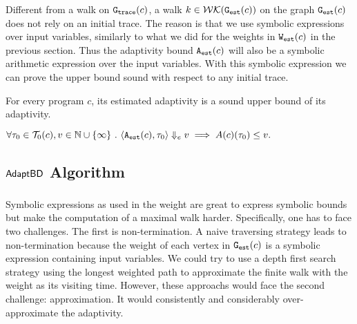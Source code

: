 Different from a walk on $\mathtt{{G_{trace}}}(c)$, a walk $k \in \mathcal{WK}(\mathtt{{G_{est}}}(c))$ on the graph $\mathtt{{G_{est}}}(c)$
 does not rely on an initial trace. 
 The reason is that we use symbolic expressions over input variables, similarly to what we did for the weights in $\mathtt{{W_{est}}}(c)$ in the previous section. Thus the adaptivity bound ${\mathtt{A_{est}}}(c)$ will also be a symbolic arithmetic expression over the input variables. With this symbolic expression we can prove the upper bound sound with respect to any initial trace. 

%
\begin{thm}
    \label{thm:sound_progadapt}
    For every program $c$, 
    its estimated adaptivity is a sound upper bound of its adaptivity.
\begin{center}
$
     \forall \mathtt{\tau}_0 \in \mathcal{T}_{0}(c), v \in \mathbb{N}\cup \{\infty\} ~.~ 
\langle {\ensuremath{\mathtt{A_{est}}}}(c), \mathtt{\tau}_0 \rangle \Downarrow_e v \implies A(c)(\mathtt{\tau}_0) \leq v.
$
\end{center}
\end{thm}


\subsection{$\mathsf{AdaptBD}$ Algorithm}
\subsubsection{}
Symbolic expressions as used in the weight  are great to express symbolic bounds but make the computation of 
a maximal walk harder. Specifically, one has to face two challenges. The first is non-termination.
A naive traversing strategy leads to non-termination
because the weight of each vertex in $\mathtt{{G_{est}}}({c})$
is a symbolic expression containing input variables.
We could try to use a depth first search strategy
using the longest weighted path to approximate
the finite walk with the weight as
its visiting time. However, these approachs would face the second challenge: approximation.
It would consistently and considerably over-approximate the adaptivity.

